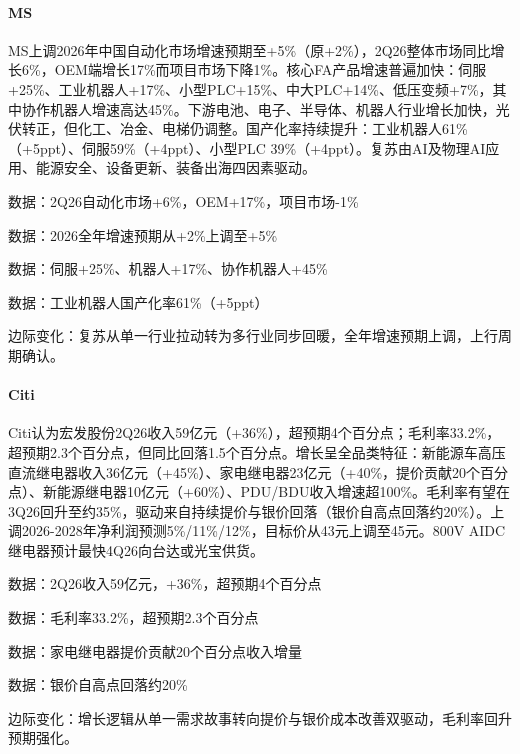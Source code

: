 \documentclass[11pt]{ctexart}
\begin{document}
\paragraph{MS} MS上调2026年中国自动化市场增速预期至+5\%（原+2\%），2Q26整体市场同比增长6\%，OEM端增长17\%而项目市场下降1\%。核心FA产品增速普遍加快：伺服+25\%、工业机器人+17\%、小型PLC+15\%、中大PLC+14\%、低压变频+7\%，其中协作机器人增速高达45\%。下游电池、电子、半导体、机器人行业增长加快，光伏转正，但化工、冶金、电梯仍调整。国产化率持续提升：工业机器人61\%（+5ppt）、伺服59\%（+4ppt）、小型PLC 39\%（+4ppt）。复苏由AI及物理AI应用、能源安全、设备更新、装备出海四因素驱动。
{\small\color{refgray}数据：2Q26自动化市场+6\%，OEM+17\%，项目市场-1\%\par}
{\small\color{refgray}数据：2026全年增速预期从+2\%上调至+5\%\par}
{\small\color{refgray}数据：伺服+25\%、机器人+17\%、协作机器人+45\%\par}
{\small\color{refgray}数据：工业机器人国产化率61\%（+5ppt）\par}
{\small\color{refgray}边际变化：复苏从单一行业拉动转为多行业同步回暖，全年增速预期上调，上行周期确认。\par}
\paragraph{Citi} Citi认为宏发股份2Q26收入59亿元（+36\%），超预期4个百分点；毛利率33.2\%，超预期2.3个百分点，但同比回落1.5个百分点。增长呈全品类特征：新能源车高压直流继电器收入36亿元（+45\%）、家电继电器23亿元（+40\%，提价贡献20个百分点）、新能源继电器10亿元（+60\%）、PDU/BDU收入增速超100\%。毛利率有望在3Q26回升至约35\%，驱动来自持续提价与银价回落（银价自高点回落约20\%）。上调2026-2028年净利润预测5\%/11\%/12\%，目标价从43元上调至45元。800V AIDC继电器预计最快4Q26向台达或光宝供货。
{\small\color{refgray}数据：2Q26收入59亿元，+36\%，超预期4个百分点\par}
{\small\color{refgray}数据：毛利率33.2\%，超预期2.3个百分点\par}
{\small\color{refgray}数据：家电继电器提价贡献20个百分点收入增量\par}
{\small\color{refgray}数据：银价自高点回落约20\%\par}
{\small\color{refgray}边际变化：增长逻辑从单一需求故事转向提价与银价成本改善双驱动，毛利率回升预期强化。\par}
\end{document}
